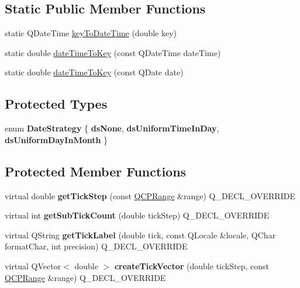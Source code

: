 \subsection*{Static Public Member Functions}
\begin{DoxyCompactItemize}
\item 
static Q\+Date\+Time \hyperlink{class_q_c_p_axis_ticker_date_time_a4c1761ad057f5564804a53f942629b53}{key\+To\+Date\+Time} (double key)
\item 
static double \hyperlink{class_q_c_p_axis_ticker_date_time_aa24f293f16fff0f937bf71f4140033f1}{date\+Time\+To\+Key} (const Q\+Date\+Time date\+Time)
\item 
static double \hyperlink{class_q_c_p_axis_ticker_date_time_ad87afc7dba65843f68da5ca88bc004f4}{date\+Time\+To\+Key} (const Q\+Date date)
\end{DoxyCompactItemize}
\subsection*{Protected Types}
\begin{DoxyCompactItemize}
\item 
\mbox{\label{class_q_c_p_axis_ticker_date_time_af2c7c60821a6234ca7a172f42ef7f1d8}} 
enum {\bfseries Date\+Strategy} \{ {\bfseries ds\+None}, 
{\bfseries ds\+Uniform\+Time\+In\+Day}, 
{\bfseries ds\+Uniform\+Day\+In\+Month}
 \}
\end{DoxyCompactItemize}
\subsection*{Protected Member Functions}
\begin{DoxyCompactItemize}
\item 
\mbox{\label{class_q_c_p_axis_ticker_date_time_a0560c14a3f87bb99ab136aca8321b32a}} 
virtual double {\bfseries get\+Tick\+Step} (const \hyperlink{class_q_c_p_range}{Q\+C\+P\+Range} \&range) Q\+\_\+\+D\+E\+C\+L\+\_\+\+O\+V\+E\+R\+R\+I\+DE
\item 
\mbox{\label{class_q_c_p_axis_ticker_date_time_a78dece0d51426a3c310528d413e09193}} 
virtual int {\bfseries get\+Sub\+Tick\+Count} (double tick\+Step) Q\+\_\+\+D\+E\+C\+L\+\_\+\+O\+V\+E\+R\+R\+I\+DE
\item 
\mbox{\label{class_q_c_p_axis_ticker_date_time_a4dc6a03f7ea5c619477528a683ed5c18}} 
virtual Q\+String {\bfseries get\+Tick\+Label} (double tick, const Q\+Locale \&locale, Q\+Char format\+Char, int precision) Q\+\_\+\+D\+E\+C\+L\+\_\+\+O\+V\+E\+R\+R\+I\+DE
\item 
\mbox{\label{class_q_c_p_axis_ticker_date_time_a44c2c09a303d281801b69226e243047d}} 
virtual Q\+Vector$<$ double $>$ {\bfseries create\+Tick\+Vector} (double tick\+Step, const \hyperlink{class_q_c_p_range}{Q\+C\+P\+Range} \&range) Q\+\_\+\+D\+E\+C\+L\+\_\+\+O\+V\+E\+R\+R\+I\+DE
\end{DoxyCompactItemize}
